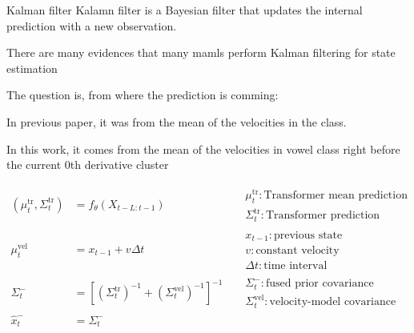 \begin{frame}[allowframebreaks]{Kalman filter}
    Kalamn filter is a Bayesian filter that updates the internal prediction with a new observation.
    
    There are many evidences that many mamls perform Kalman filtering for state estimation \cite{wolpert-2007-probabilistic-models-in-human-sensorimotor-control}
    
    The question is, from where the prediction is comming:
    
    In previous paper, it was from the mean of the velocities in the class.
    
    In this work, it comes from the mean of the velocities in vowel class right before the current 0th derivative cluster
    
    \[
        \begin{aligned}
        (\mu^{\mathrm{tr}}_{t},\Sigma^{\mathrm{tr}}_{t})
            &=
            f_{\theta}(X_{t-L:t-1})
            &&
            \begin{array}{l}
                \mu^{\mathrm{tr}}_{t}: \text{Transformer mean prediction} \\
                \Sigma^{\mathrm{tr}}_{t}: \text{Transformer prediction covariance}
            \end{array}
            \\[8pt]
            \mu^{\mathrm{vel}}_{t}
            &=
            x_{t-1}
            +
            v\Delta t
            &&
            \begin{array}{l}
                x_{t-1}: \text{previous state} \\
                v: \text{constant velocity} \\
                \Delta t: \text{time interval}
            \end{array}
            \\[8pt]
            \Sigma^{-}_{t}
            &=
            \left[
                (\Sigma^{\mathrm{tr}}_{t})^{-1}
                +
                (\Sigma^{\mathrm{vel}}_{t})^{-1}
            \right]^{-1}
            &&
            \begin{array}{l}
                \Sigma^{-}_{t}: \text{fused prior covariance} \\
                \Sigma^{\mathrm{vel}}_{t}: \text{velocity-model covariance}
            \end{array}
            \\[8pt]
            \hat{x}^{-}_{t}
            &=
            \Sigma^{-}_{t}

\end{aligned}\]
\end{frame}
